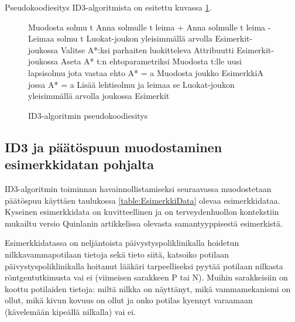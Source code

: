 \documentclass[12pt,finnish]{tktltiki2}
\theoremstyle{definition}
\theoremstyle{remark}
\begin{document}
Pseudokoodiesitys ID3-algoritmista on esitettu kuvassa \ref{fig:pseudokoodi}.


\begin{figure}
\begin{algorithmic}
\State Muodosta solmu t
    \State Anna solmulle t leima +
    \State{}
\EndIf
{}
    \State Anna solmulle t leima -
    \State{}
\EndIf
\State Leimaa solmu t Luokat-joukon yleisimmällä arvolla Esimerkit-joukossa  
    \State{}
\EndIf    
\State Valitse {A*}:ksi {parhaiten luokitteleva Attribuutti Esimerkit-joukossa}
\State Aseta A* t:n ehtoparametriksi
    \State Muodosta t:lle uusi lapsisolmu jota vastaa ehto A* = a
    \State Muodosta joukko EsimerkkiA jossa A* = a
        \State Lisää lehtisolmu ja leimaa se Luokat-joukon yleisimmällä arvolla joukossa Esimerkit
    \Else
    \EndIf
\EndFor
\State{}
\EndFunction
\end{algorithmic}
\caption{ID3-algoritmin pseudokoodiesitys}
\label{fig:pseudokoodi}
\end{figure}


\subsection{ID3 ja päätöspuun muodostaminen esimerkkidatan pohjalta}
\label{sec:ID3esimerkki}

ID3-algoritmin toiminnan havainnollistamiseksi seuraavassa muodostetaan päätöspuu käyttäen taulukossa \ref{table:EsimerkkiData} olevaa esimerkkidataa.
Kyseinen esimerkkidata on kuvitteellinen ja on terveydenhuollon kontekstiin mukailtu versio Quinlanin artikkelissa
\cite{quinlan} olevasta samantyyppisestä esimerkistä. 

Esimerkkidatassa on neljäntoista päivystyspoliklinikalla hoidetun nilkkavammapotilaan tietoja sekä tieto siitä, katsoiko potilaan
päivystyspoliklinikalla hoitanut lääkäri tarpeelliseksi pyytää potilaan nilkasta röntgentutkimusta vai ei (viimeisen
sarakkeen P tai N). Muihin sarakkeisiin on koottu potilaiden tietoja: miltä nilkka on näyttänyt, mikä vammamekanismi on ollut, mikä kivun kovuus
on ollut ja onko potilas kyennyt varaamaan (kävelemään kipeällä nilkalla) vai ei.
\end{document}
